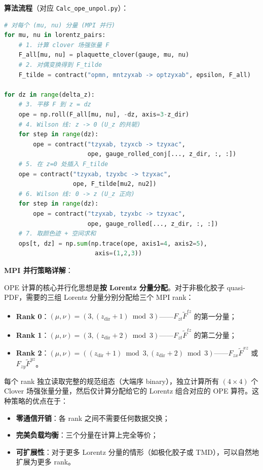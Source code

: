 \documentclass[11pt,a4paper]{ctexart}
\begin{document}
\textbf{算法流程}（对应 \texttt{Calc\_ope\_unpol.py}）：
\begin{lstlisting}[language=Python, caption=OPE 计算核心循环]
# 对每个 (mu, nu) 分量 (MPI 并行)
for mu, nu in lorentz_pairs:
    # 1. 计算 clover 场强张量 F
    F_all[mu, nu] = plaquette_clover(gauge, mu, nu)
    # 2. 对偶变换得到 F_tilde
    F_tilde = contract("opmn, mntzyxab -> optzyxab", epsilon, F_all)

for dz in range(delta_z):
    # 3. 平移 F 到 z = dz
    ope = np.roll(F_all[mu, nu], -dz, axis=3-z_dir)
    # 4. Wilson 线: z -> 0 (U_z 的共轭)
    for step in range(dz):
        ope = contract("tzyxab, tzyxcb -> tzyxac",
                       ope, gauge_rolled_conj[..., z_dir, :, :])
    # 5. 在 z=0 处插入 F_tilde
    ope = contract("tzyxab, tzyxbc -> tzyxac",
                   ope, F_tilde[mu2, nu2])
    # 6. Wilson 线: 0 -> z (U_z 正向)
    for step in range(dz):
        ope = contract("tzyxab, tzyxbc -> tzyxac",
                       ope, gauge_rolled[..., z_dir, :, :])
    # 7. 取颜色迹 + 空间求和
    ops[t, dz] = np.sum(np.trace(ope, axis1=4, axis2=5),
                         axis=(1,2,3))
\end{lstlisting}

\textbf{MPI 并行策略详解}：

OPE 计算的核心并行化思想是\textbf{按 Lorentz 分量分配}。对于非极化胶子 quasi-PDF，需要的三组 Lorentz 分量分别分配给三个 MPI rank：
\begin{itemize}
  \item \textbf{Rank 0}：$(\mu,\nu)=(3,(z_{\text{dir}}+1)\bmod 3)$——$F_{zt}\tilde{F}^{tz}$ 的第一分量；
  \item \textbf{Rank 1}：$(\mu,\nu)=(3,(z_{\text{dir}}+2)\bmod 3)$——$F_{zt}\tilde{F}^{tz}$ 的第二分量；
  \item \textbf{Rank 2}：$(\mu,\nu)=((z_{\text{dir}}+1)\bmod 3,(z_{\text{dir}}+2)\bmod 3)$——$F_{zx}\tilde{F}^{xz}$ 或 $F_{zy}\tilde{F}^{yz}$。
\end{itemize}

每个 rank 独立读取完整的规范组态（大端序 binary），独立计算所有 $(4\times4)$ 个 Clover 场强张量分量，然后仅计算分配给它的 Lorentz 组合对应的 OPE 算符。这种策略的优点在于：
\begin{itemize}
  \item \textbf{零通信开销}：各 rank 之间不需要任何数据交换；
  \item \textbf{完美负载均衡}：三个分量在计算上完全等价；
  \item \textbf{可扩展性}：对于更多 Lorentz 分量的情形（如极化胶子或 TMD），可以自然地扩展为更多 rank。
\end{itemize}
\end{document}
